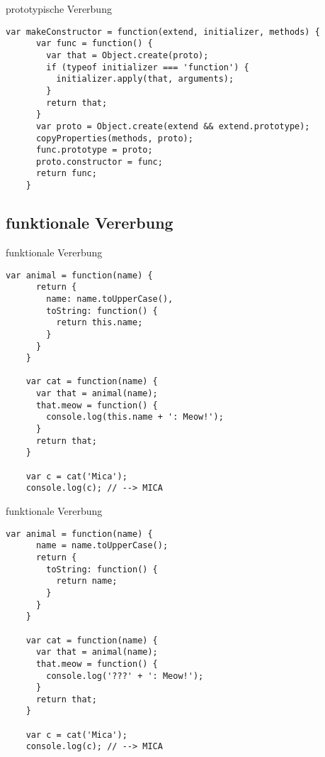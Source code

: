 \begin{frame}[fragile]{prototypische Vererbung}
  \begin{lstlisting}[gobble=4]
    var makeConstructor = function(extend, initializer, methods) {
      var func = function() {
        var that = Object.create(proto);
        if (typeof initializer === 'function') {
          initializer.apply(that, arguments);
        }
        return that;
      }
      var proto = Object.create(extend && extend.prototype);
      copyProperties(methods, proto);
      func.prototype = proto;
      proto.constructor = func;
      return func;
    }
  \end{lstlisting}
\end{frame}

\subsection{funktionale Vererbung}

\begin{frame}[fragile]{funktionale Vererbung}
  \begin{lstlisting}[gobble=4]
    var animal = function(name) {
      return {
        name: name.toUpperCase(),
        toString: function() {
          return this.name;
        }
      }
    }
    
    var cat = function(name) {
      var that = animal(name);
      that.meow = function() {
        console.log(this.name + ': Meow!');
      }
      return that;
    }
    
    var c = cat('Mica');
    console.log(c); // --> MICA
  \end{lstlisting}
\end{frame}

\begin{frame}[fragile]{funktionale Vererbung}
  \begin{lstlisting}[gobble=4]
    var animal = function(name) {
      name = name.toUpperCase();
      return {
        toString: function() {
          return name;
        }
      }
    }
    
    var cat = function(name) {
      var that = animal(name);
      that.meow = function() {
        console.log('???' + ': Meow!');
      }
      return that;
    }
    
    var c = cat('Mica');
    console.log(c); // --> MICA
  \end{lstlisting}
\end{frame}

